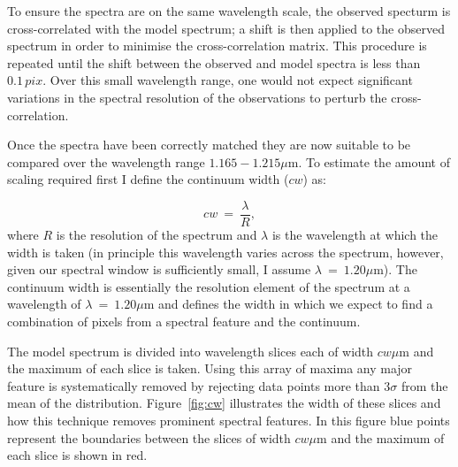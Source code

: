 To ensure the spectra are on the same wavelength scale, the observed specturm is cross-correlated with the model spectrum;
a shift is then applied to the observed spectrum in order to minimise the cross-correlation matrix.
This procedure is repeated until the shift between the observed and model spectra is less than $0.1\,pix$.
Over this small wavelength range, one would not expect significant variations in the spectral resolution of the observations to perturb the cross-correlation.

Once the spectra have been correctly matched they are now suitable to be compared over the wavelength range $1.165-1.215\mu$m.
To estimate the amount of scaling required first I define the continuum width ($cw$) as:

\begin{equation}
    cw~=~\frac{\lambda}{R}, %
\end{equation}
\noindent where $R$ is the resolution of the spectrum and
$\lambda$ is the wavelength at which the width is taken
(in principle this wavelength varies across the spectrum, however, given our spectral window is sufficiently small, I assume $\lambda~=~1.20\mu$m).
The continuum width is essentially the resolution element of the spectrum at a wavelength of
$\lambda~=~1.20\mu$m and defines the width in which we expect to find a combination of pixels from a spectral feature and the continuum.


The model spectrum is divided into wavelength slices each of width $cw\mu$m and the maximum of each slice is taken.
Using this array of maxima any major feature is systematically removed by rejecting data points more than 3$\sigma$ from the mean of the distribution.
Figure~\ref{fig:cw} illustrates the width of these slices and how this technique  removes prominent spectral features.
In this figure blue points represent the boundaries between the slices of width $cw\mu$m and the maximum of each slice is shown in red.

